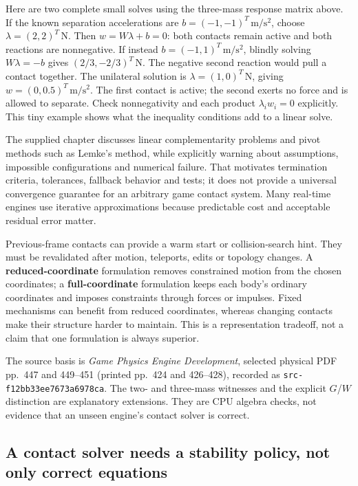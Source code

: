 Here are two complete small solves using the three-mass response matrix above. If the known separation accelerations are \(b=(-1,-1)^T\,\mathrm{m/s^2}\), choose \(\lambda=(2,2)^T\,\mathrm N\). Then \(w=W\lambda+b=0\): both contacts remain active and both reactions are nonnegative. If instead \(b=(-1,1)^T\,\mathrm{m/s^2}\), blindly solving \(W\lambda=-b\) gives \((2/3,-2/3)^T\,\mathrm N\). The negative second reaction would pull a contact together. The unilateral solution is \(\lambda=(1,0)^T\,\mathrm N\), giving \(w=(0,0.5)^T\,\mathrm{m/s^2}\). The first contact is active; the second exerts no force and is allowed to separate. Check nonnegativity and each product \(\lambda_iw_i=0\) explicitly. This tiny example shows what the inequality conditions add to a linear solve.

The supplied chapter discusses linear complementarity problems and pivot methods such as Lemke's method, while explicitly warning about assumptions, impossible configurations and numerical failure. That motivates termination criteria, tolerances, fallback behavior and tests; it does not provide a universal convergence guarantee for an arbitrary game contact system. Many real-time engines use iterative approximations because predictable cost and acceptable residual error matter.

Previous-frame contacts can provide a warm start or collision-search hint. They must be revalidated after motion, teleports, edits or topology changes. A \textbf{reduced-coordinate} formulation removes constrained motion from the chosen coordinates; a \textbf{full-coordinate} formulation keeps each body's ordinary coordinates and imposes constraints through forces or impulses. Fixed mechanisms can benefit from reduced coordinates, whereas changing contacts make their structure harder to maintain. This is a representation tradeoff, not a claim that one formulation is always superior.

The source basis is \emph{Game Physics Engine Development}, selected physical PDF pp.~447 and 449--451 (printed pp.~424 and 426--428), recorded as \texttt{src-f12bb33ee7673a6978ca}. The two- and three-mass witnesses and the explicit \(G\)/\(W\) distinction are explanatory extensions. They are CPU algebra checks, not evidence that an unseen engine's contact solver is correct.

\subsection{A contact solver needs a stability policy, not only correct equations}\label{06-engine-ii-ch046-a-contact-solver-needs-a-stability-policy-not-only-correct-equations}

